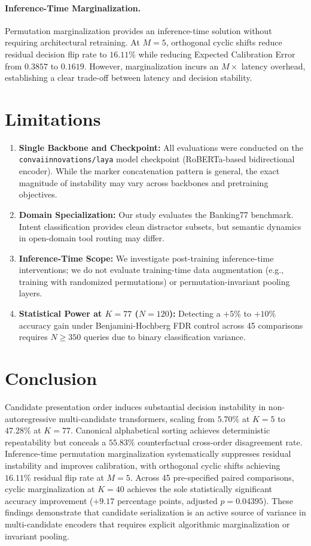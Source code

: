 \documentclass[11pt,a4paper]{article}
\begin{document}
\paragraph{Inference-Time Marginalization.}
Permutation marginalization provides an inference-time solution without requiring architectural retraining. At $M=5$, orthogonal cyclic shifts reduce residual decision flip rate to $16.11\%$ while reducing Expected Calibration Error from $0.3857$ to $0.1619$. However, marginalization incurs an $M\times$ latency overhead, establishing a clear trade-off between latency and decision stability.

\section{Limitations}

\begin{enumerate}
    \item \textbf{Single Backbone and Checkpoint:} All evaluations were conducted on the \nolinkurl{convaiinnovations/laya} model checkpoint (RoBERTa-based bidirectional encoder). While the marker concatenation pattern is general, the exact magnitude of instability may vary across backbones and pretraining objectives.
    \item \textbf{Domain Specialization:} Our study evaluates the Banking77 benchmark. Intent classification provides clean distractor subsets, but semantic dynamics in open-domain tool routing may differ.
    \item \textbf{Inference-Time Scope:} We investigate post-training inference-time interventions; we do not evaluate training-time data augmentation (e.g., training with randomized permutations) or permutation-invariant pooling layers.
    \item \textbf{Statistical Power at $K=77$ ($N=120$):} Detecting a $+5\%$ to $+10\%$ accuracy gain under Benjamini-Hochberg FDR control across 45 comparisons requires $N \ge 350$ queries due to binary classification variance.
\end{enumerate}

\section{Conclusion}

Candidate presentation order induces substantial decision instability in non-autoregressive multi-candidate transformers, scaling from $5.70\%$ at $K=5$ to $47.28\%$ at $K=77$. Canonical alphabetical sorting achieves deterministic repeatability but conceals a $55.83\%$ counterfactual cross-order disagreement rate. Inference-time permutation marginalization systematically suppresses residual instability and improves calibration, with orthogonal cyclic shifts achieving $16.11\%$ residual flip rate at $M=5$. Across 45 pre-specified paired comparisons, cyclic marginalization at $K=40$ achieves the sole statistically significant accuracy improvement ($+9.17$ percentage points, adjusted $p=0.04395$). These findings demonstrate that candidate serialization is an active source of variance in multi-candidate encoders that requires explicit algorithmic marginalization or invariant pooling.
\end{document}
